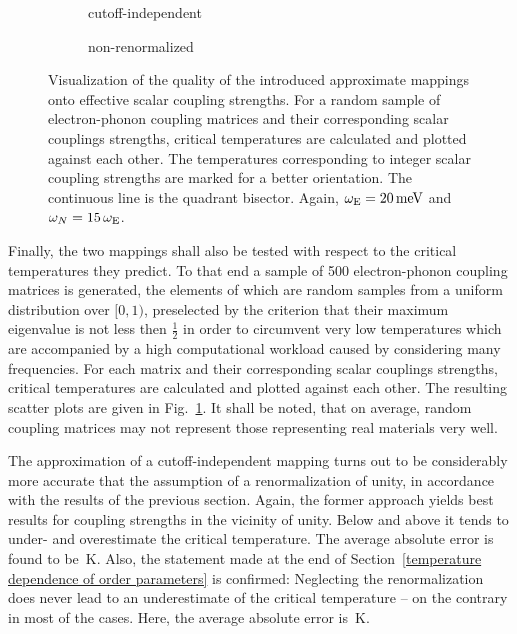 \begin{figure}
    \small
    \begin{subfigure}{7cm}
        
        \caption{cutoff-independent}
    \end{subfigure}%
    \begin{subfigure}{7cm}
        
        \caption{non-renormalized}
    \end{subfigure}%
    \caption[Quality of the effective scalar coupling strengths]{
        Visualization of the quality of the introduced approximate mappings onto
        effective scalar coupling strengths. For a random sample of
        electron-phonon coupling matrices and their corresponding scalar
        couplings strengths, critical temperatures are calculated and plotted
        against each other. The temperatures corresponding to integer scalar
        coupling strengths are marked for a better orientation. The continuous
        line is the quadrant bisector. Again, $\omega \sb{\text{E}} = 20 \, \mathrm{meV}$
        and $\omega_N = 15 \, \omega \sb{\text{E}}$.}
    \label{quality of the effective scalar coupling strengths}
\end{figure}
%
Finally, the two mappings shall also be tested with respect to the critical
temperatures they predict. To that end a sample of 500 electron-phonon coupling
matrices is generated, the elements of which are random samples from a uniform
distribution over $[0, 1)$, preselected by the criterion that their maximum
eigenvalue is not less then $\frac 1 2$ in order to circumvent very low
temperatures which are accompanied by a high computational workload caused by
considering many  frequencies. For each matrix and their
corresponding scalar couplings strengths, critical temperatures are calculated
and plotted against each other. The resulting scatter plots are given in
Fig.~\ref{quality of the effective scalar coupling strengths}. It shall be
noted, that on average, random coupling matrices may not represent those
representing real materials very well.

The approximation of a cutoff-independent mapping turns out to be considerably
more accurate that the assumption of a renormalization of unity, in accordance
with the results of the previous section. Again, the former approach yields best
results for coupling strengths in the vicinity of unity. Below and above it
tends to under- and overestimate the critical temperature. The average absolute
error is found to be \,K. Also, the statement
made at the end of Section~\ref{temperature dependence of order parameters} is
confirmed: Neglecting the renormalization does never lead to an underestimate of
the critical temperature -- on the contrary in most of the cases. Here, the
average absolute error is \,K.
